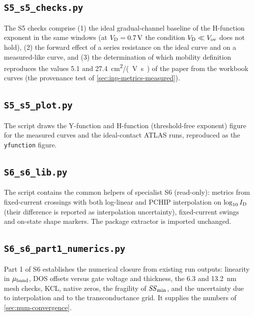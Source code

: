 \subsection{\texttt{S5\_s5\_checks.py}}
The S5 checks comprise (1) the ideal gradual-channel baseline of the H-function exponent in the same windows (at
$V_{\mathrm{D}} = \SI{0.7}{V}$ the condition $V_{\mathrm{D}} \ll V_{\mathrm{ov}}$ does not hold), (2) the forward effect of a series resistance
on the ideal curve and on a measured-like curve, and (3) the determination of which mobility definition reproduces the
values 5.1 and \SI{27.4}{cm^2/(V.s)} of the paper from the workbook curves (the provenance test of
\cref{sec:inp-metrics-measured}).


\subsection{\texttt{S5\_s5\_plot.py}}
The script draws the Y-function and H-function (threshold-free exponent) figure for the measured curves and the
ideal-contact ATLAS runs, reproduced as the \texttt{yfunction} figure.


\subsection{\texttt{S6\_s6\_lib.py}}
The script contains the common helpers of specialist S6 (read-only): metrics from fixed-current crossings with both
log-linear and PCHIP interpolation on $\log_{10}I_{\mathrm{D}}$ (their difference is reported as interpolation uncertainty),
fixed-current swings and on-state shape markers. The package extractor  is imported
unchanged.


\subsection{\texttt{S6\_s6\_part1\_numerics.py}}
Part 1 of S6 establishes the numerical closure from existing run outputs: linearity in $\mu_{\mathrm{band}}$, DOS offsets versus gate
voltage and thickness, the 6.3 and \SI{13.2}{nm} mesh checks, KCL, native zeros, the fragility of $\mathit{SS}_{\min}$, and the
uncertainty due to interpolation and to the transconductance grid. It supplies the numbers of \cref{sec:num-convergence}.


